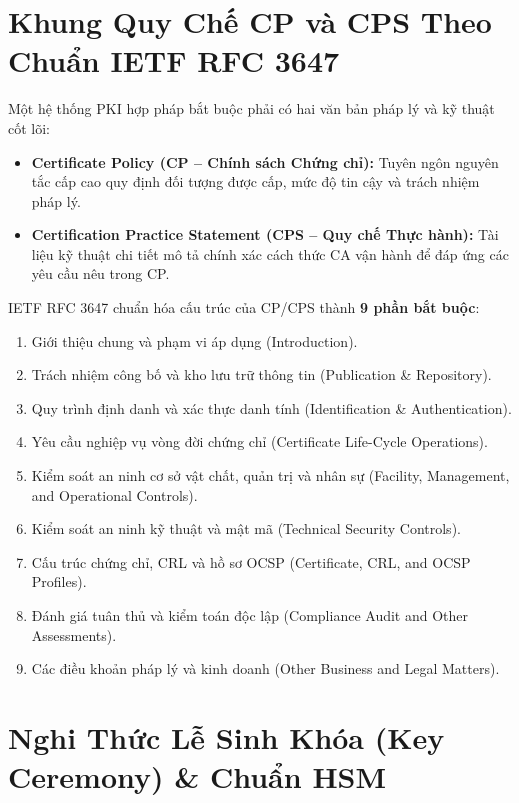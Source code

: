 \section{Khung Quy Chế CP và CPS Theo Chuẩn IETF RFC 3647}

Một hệ thống PKI hợp pháp bắt buộc phải có hai văn bản pháp lý và kỹ thuật cốt lõi:
\begin{itemize}
  \item \textbf{Certificate Policy (CP -- Chính sách Chứng chỉ):} Tuyên ngôn nguyên tắc cấp cao quy định đối tượng được cấp, mức độ tin cậy và trách nhiệm pháp lý.
  \item \textbf{Certification Practice Statement (CPS -- Quy chế Thực hành):} Tài liệu kỹ thuật chi tiết mô tả chính xác cách thức CA vận hành để đáp ứng các yêu cầu nêu trong CP.
\end{itemize}

IETF RFC 3647 chuẩn hóa cấu trúc của CP/CPS thành \textbf{9 phần bắt buộc}:
\begin{enumerate}
  \item Giới thiệu chung và phạm vi áp dụng (Introduction).
  \item Trách nhiệm công bố và kho lưu trữ thông tin (Publication \& Repository).
  \item Quy trình định danh và xác thực danh tính (Identification \& Authentication).
  \item Yêu cầu nghiệp vụ vòng đời chứng chỉ (Certificate Life-Cycle Operations).
  \item Kiểm soát an ninh cơ sở vật chất, quản trị và nhân sự (Facility, Management, and Operational Controls).
  \item Kiểm soát an ninh kỹ thuật và mật mã (Technical Security Controls).
  \item Cấu trúc chứng chỉ, CRL và hồ sơ OCSP (Certificate, CRL, and OCSP Profiles).
  \item Đánh giá tuân thủ và kiểm toán độc lập (Compliance Audit and Other Assessments).
  \item Các điều khoản pháp lý và kinh doanh (Other Business and Legal Matters).
\end{enumerate}

\section{Nghi Thức Lễ Sinh Khóa (Key Ceremony) \& Chuẩn HSM}

